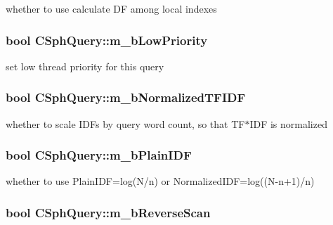 whether to use calculate D\-F among local indexes 

\hypertarget{classCSphQuery_af46ec4b566c3cf271e8486caf8d27169}{
\subsubsection[{m\-\_\-b\-Low\-Priority}]{\setlength{\rightskip}{0pt plus 5cm}bool C\-Sph\-Query\-::m\-\_\-b\-Low\-Priority}}\label{classCSphQuery_af46ec4b566c3cf271e8486caf8d27169}


set low thread priority for this query 

\hypertarget{classCSphQuery_a519eff08a0311ee531b99d232fa4542f}{
\subsubsection[{m\-\_\-b\-Normalized\-T\-F\-I\-D\-F}]{\setlength{\rightskip}{0pt plus 5cm}bool C\-Sph\-Query\-::m\-\_\-b\-Normalized\-T\-F\-I\-D\-F}}\label{classCSphQuery_a519eff08a0311ee531b99d232fa4542f}


whether to scale I\-D\-Fs by query word count, so that T\-F$\ast$\-I\-D\-F is normalized 

\hypertarget{classCSphQuery_a7fcc6af7a9ba80651515e767ba3aab30}{
\subsubsection[{m\-\_\-b\-Plain\-I\-D\-F}]{\setlength{\rightskip}{0pt plus 5cm}bool C\-Sph\-Query\-::m\-\_\-b\-Plain\-I\-D\-F}}\label{classCSphQuery_a7fcc6af7a9ba80651515e767ba3aab30}


whether to use Plain\-I\-D\-F=log(N/n) or Normalized\-I\-D\-F=log((N-\/n+1)/n) 

\hypertarget{classCSphQuery_a7412f89477542f7f5b87d1f16a7f068c}{
\subsubsection[{m\-\_\-b\-Reverse\-Scan}]{\setlength{\rightskip}{0pt plus 5cm}bool C\-Sph\-Query\-::m\-\_\-b\-Reverse\-Scan}}\label{classCSphQuery_a7412f89477542f7f5b87d1f16a7f068c}


